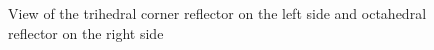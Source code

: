 \documentclass[12pt,DIV14,BCOR12mm,a4paper,footinclude=false,headinclude,parskip=half-,twoside,openright,cleardoublepage=empty,toc=index,bibliography=totoc,listof=totoc]{scrreprt}
\numberwithin{equation}{chapter}
\begin{document}
\begin{figure}
    \centering
    \begin{subfigure}{0.45\textwidth}
        \centering
    \end{subfigure}
    \begin{subfigure}{0.45\textwidth}
        \centering
    \end{subfigure}
    \caption{View of the trihedral corner reflector on the left side and octahedral reflector on the right side}
    \label{view of the reflector}
\end{figure}
\end{document}
